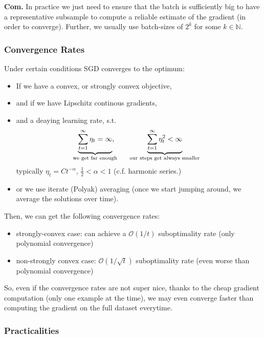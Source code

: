 \documentclass[a2paper,8pt]{extarticle}
\newcommand{\BigO}{\mathcal{O}}
\newcommand{\N}{\mathbb{N}}
\newcommand{\Com}{\textbf{Com.} }
\begin{document}
\begin{landscape}
\begin{multicols*}{7}
\Com In practice we just need to ensure that the batch is sufficiently big to
have a representative subsample to compute a reliable estimate of the gradient
(in order to converge). Further, we usually use batch-sizes of $2^k$ for some
$k\in\N$.

\subsubsection{Convergence Rates}

Under certain conditions SGD converges to the optimum:
\begin{itemize}
  \item If we have a convex, or strongly convex objective,
  \item and if we have Lipschitz continous gradients,
  \item and a deaying learning rate, s.t.
  \[
  \underbrace{\sum_{t=1}^\infty\eta_t=\infty}_{\mathclap{\text{we get far
  enough}}},
  \qquad
  \underbrace{\sum_{t=1}^\infty\eta_t^2<\infty}_{\text{our steps get always
  smaller}}
  \]
  typically $\eta_t=Ct^{-\alpha}$, $\frac{1}{2}<\alpha<1$ (c.f. harmonic
  series.)
  \item or we use iterate (Polyak) averaging (once we start jumping around, we
  average the solutions over time).
\end{itemize}
Then, we can get the following convergence rates:
\begin{itemize}
  \item strongly-convex case: can achieve a $\BigO(1/t)$ suboptimality rate
  (only polynomial convergence)
  \item non-strongly convex case: $\BigO(1/\sqrt{t})$ suboptimality rate (even
  worse than polynomial convergence)
\end{itemize}
So, even if the convergence rates are not super nice, thanks to the cheap
gradient computation (only one example at the time), we may even converge faster
than computing the gradient on the full dataset everytime.

\subsubsection{Practicalities}


\end{multicols*}
\end{landscape}
\end{document}
